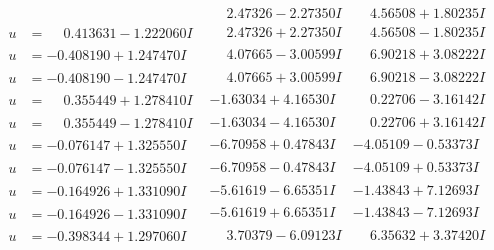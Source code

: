 \documentclass[1p]{elsarticle_modified}
\theoremstyle{definition}
\begin{document}
$$\begin{array}{c|c|c}
 & \phantom{-}2.47326 - 2.27350 I & \phantom{-}4.56508 + 1.80235 I \\ \hline\begin{aligned}
u &= \phantom{-}0.413631 - 1.222060 I\end{aligned}
 & \phantom{-}2.47326 + 2.27350 I & \phantom{-}4.56508 - 1.80235 I \\ \hline\begin{aligned}
u &= -0.408190 + 1.247470 I\end{aligned}
 & \phantom{-}4.07665 - 3.00599 I & \phantom{-}6.90218 + 3.08222 I \\ \hline\begin{aligned}
u &= -0.408190 - 1.247470 I\end{aligned}
 & \phantom{-}4.07665 + 3.00599 I & \phantom{-}6.90218 - 3.08222 I \\ \hline\begin{aligned}
u &= \phantom{-}0.355449 + 1.278410 I\end{aligned}
 & -1.63034 + 4.16530 I & \phantom{-}0.22706 - 3.16142 I \\ \hline\begin{aligned}
u &= \phantom{-}0.355449 - 1.278410 I\end{aligned}
 & -1.63034 - 4.16530 I & \phantom{-}0.22706 + 3.16142 I \\ \hline\begin{aligned}
u &= -0.076147 + 1.325550 I\end{aligned}
 & -6.70958 + 0.47843 I & -4.05109 - 0.53373 I \\ \hline\begin{aligned}
u &= -0.076147 - 1.325550 I\end{aligned}
 & -6.70958 - 0.47843 I & -4.05109 + 0.53373 I \\ \hline\begin{aligned}
u &= -0.164926 + 1.331090 I\end{aligned}
 & -5.61619 - 6.65351 I & -1.43843 + 7.12693 I \\ \hline\begin{aligned}
u &= -0.164926 - 1.331090 I\end{aligned}
 & -5.61619 + 6.65351 I & -1.43843 - 7.12693 I \\ \hline\begin{aligned}
u &= -0.398344 + 1.297060 I\end{aligned}
 & \phantom{-}3.70379 - 6.09123 I & \phantom{-}6.35632 + 3.37420 I \\ \hline\begin{aligned}

\end{aligned}
\end{array}$$
\end{document}
